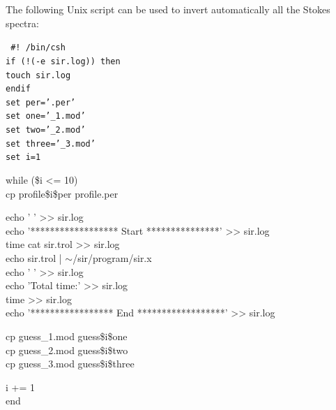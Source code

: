 \documentclass[11pt]{report}
\begin{document}
The following Unix script can be used to invert automatically
all the Stokes spectra:

{\tt 
\noindent       \#! /bin/csh  \\
\noindent       if (!(-e sir.log)) then  \\
\hspace*{2em}      touch sir.log   \\
                endif  \\
		set per='.per'      \\
                set one='\_1.mod'   \\
                set two='\_2.mod'   \\
                set three='\_3.mod'   \\
                set i=1    

\noindent       while (\$i <= 10)  \\
\hspace*{2em}      cp profile\$i\$per profile.per

\noindent  \hspace*{2em} echo ' ' >> sir.log   \\
\hspace*{2em}   echo '******************  Start ***************' >> sir.log  \\
\hspace*{2em}   time cat sir.trol >> sir.log   \\
\hspace*{2em}   echo sir.trol | $\sim$/sir/program/sir.x  \\
\hspace*{2em}   echo ' ' >> sir.log    \\
\hspace*{2em}   echo 'Total time:' >> sir.log \\ 
\hspace*{2em}   time >> sir.log  \\
\hspace*{2em}   echo '*****************  End ******************' >> sir.log  

\noindent  \hspace*{2em} cp guess\_1.mod guess\$i\$one  \\
\hspace*{2em} cp guess\_2.mod guess\$i\$two  \\
\hspace*{2em} cp guess\_3.mod guess\$i\$three  

\noindent  \@ i += 1  \\
end \\ }
\end{document}
